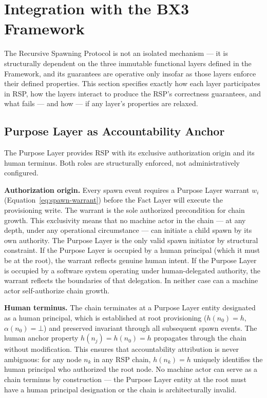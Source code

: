 \section{Integration with the BX3 Framework}
\label{sec:rs-bx3-integration}

The Recursive Spawning Protocol is not an isolated mechanism --- it is structurally dependent on the three immutable functional layers defined in the \bxthree{} Framework, and its guarantees are operative only insofar as those layers enforce their defined properties. This section specifies exactly how each layer participates in RSP, how the layers interact to produce the RSP's correctness guarantees, and what fails --- and how --- if any layer's properties are relaxed.

\subsection{Purpose Layer as Accountability Anchor}
\label{sec:rs-purpose-anchor}

The Purpose Layer provides RSP with its exclusive authorization origin and its human terminus. Both roles are structurally enforced, not administratively configured.

\medskip
\noindent\textbf{Authorization origin.} Every spawn event requires a Purpose Layer warrant $w_i$ (Equation~\ref{eq:spawn-warrant}) before the Fact Layer will execute the provisioning write. The warrant is the sole authorized precondition for chain growth. This exclusivity means that no machine actor in the chain --- at any depth, under any operational circumstance --- can initiate a child spawn by its own authority. The Purpose Layer is the only valid spawn initiator by structural constraint. If the Purpose Layer is occupied by a human principal (which it must be at the root), the warrant reflects genuine human intent. If the Purpose Layer is occupied by a software system operating under human-delegated authority, the warrant reflects the boundaries of that delegation. In neither case can a machine actor self-authorize chain growth.

\medskip
\noindent\textbf{Human terminus.} The chain terminates at a Purpose Layer entity designated as a human principal, which is established at root provisioning ($h(n_0) = h$, $\alpha(n_0) = \bot$) and preserved invariant through all subsequent spawn events. The human anchor property $h(n_j) = h(n_0) = h$ propagates through the chain without modification. This ensures that accountability attribution is never ambiguous: for any node $n_k$ in any RSP chain, $h(n_k) = h$ uniquely identifies the human principal who authorized the root node. No machine actor can serve as a chain terminus by construction --- the Purpose Layer entity at the root must have a human principal designation or the chain is architecturally invalid.

